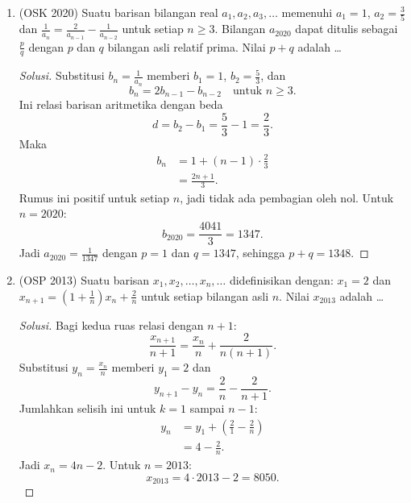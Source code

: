 \documentclass[12pt]{scrartcl}
\begin{document}
\begin{enumerate}[resume]

	\item (OSK 2020)
	Suatu barisan bilangan real $a_{1},a_{2},a_{3},\dots$ memenuhi $a_{1}=1$, $a_{2}=\frac{3}{5}$ dan $\frac{1}{a_{n}}=\frac{2}{a_{n-1}}-\frac{1}{a_{n-2}}$ untuk setiap $n\ge 3$. Bilangan $a_{2020}$ dapat ditulis sebagai $\frac{p}{q}$ dengan $p$ dan $q$ bilangan asli relatif prima. Nilai $p+q$ adalah \dots
	\begin{proof}[Solusi]
	\renewcommand{\qedsymbol}{$\blacksquare$}
	Substitusi $b_n = \frac{1}{a_n}$ memberi $b_1 = 1$, $b_2 = \frac53$, dan
	\[ b_n = 2b_{n-1} - b_{n-2} \quad \text{untuk } n \ge 3. \]
	Ini relasi barisan aritmetika dengan beda
	\[ d = b_2 - b_1 = \frac{5}{3} - 1 = \frac{2}{3}. \]
	Maka
	\begin{align*}
	b_n &= 1 + (n-1)\cdot\frac{2}{3} \\
	&= \frac{2n+1}{3}.
	\end{align*}
	Rumus ini positif untuk setiap $n$, jadi tidak ada pembagian oleh nol.
	Untuk $n = 2020$:
	\[ b_{2020} = \frac{4041}{3} = 1347. \]
	Jadi $a_{2020} = \frac{1}{1347}$ dengan $p = 1$ dan $q = 1347$,
	sehingga $p + q = 1348$.
	\end{proof}

	\item (OSP 2013)
	Suatu barisan $x_1, x_2, \dots, x_n, \dots$ didefinisikan dengan: $x_1=2$ dan $x_{n+1}=(1+\frac{1}{n})x_n+\frac{2}{n}$ untuk setiap bilangan asli $n$. Nilai $x_{2013}$ adalah \dots
	\begin{proof}[Solusi]
	\renewcommand{\qedsymbol}{$\blacksquare$}
	Bagi kedua ruas relasi dengan $n + 1$:
	\[ \frac{x_{n+1}}{n+1} = \frac{x_n}{n} + \frac{2}{n(n+1)}. \]
	Substitusi $y_n = \frac{x_n}{n}$ memberi $y_1 = 2$ dan
	\[ y_{n+1} - y_n = \frac{2}{n} - \frac{2}{n+1}. \]
	Jumlahkan selisih ini untuk $k = 1$ sampai $n - 1$:
	\begin{align*}
	y_n &= y_1 + \left(\frac{2}{1} - \frac{2}{n}\right) \\
	&= 4 - \frac{2}{n}.
	\end{align*}
	Jadi $x_n = 4n - 2$. Untuk $n = 2013$:
	\[ x_{2013} = 4 \cdot 2013 - 2 = 8050. \]
	\end{proof}


\end{enumerate}
\end{document}
